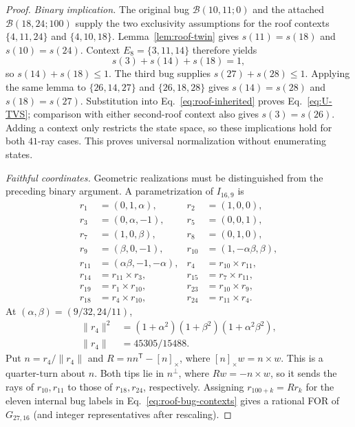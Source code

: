\documentclass[aps,pra,reprint,superscriptaddress,longbibliography,nofootinbib,floatfix,10pt]{revtex4-2}
\theoremstyle{definition}\newtheorem{definition}[theorem]{Definition}
\theoremstyle{remark}\newtheorem{remark}[theorem]{Remark}
\begin{document}
\begin{proof}
\emph{Binary implication.} The original bug $\mathcal B(10,11;0)$ and the attached $\mathcal B(18,24;100)$ supply the two exclusivity assumptions for the roof contexts $\{4,11,24\}$ and $\{4,10,18\}$. Lemma~\ref{lem:roof-twin} gives $s(11)=s(18)$ and $s(10)=s(24)$. Context $E_8=\{3,11,14\}$ therefore yields
\begin{equation}\label{eq:roof-inherited}
s(3)+s(14)+s(18)=1,
\end{equation}
so $s(14)+s(18)\le1$. The third bug supplies $s(27)+s(28)\le1$. Applying the same lemma to $\{26,14,27\}$ and $\{26,18,28\}$ gives $s(14)=s(28)$ and $s(18)=s(27)$. Substitution into Eq.~\eqref{eq:roof-inherited} proves Eq.~\eqref{eq:U-TVS}; comparison with either second-roof context also gives $s(3)=s(26)$. Adding a context only restricts the state space, so these implications hold for both $41$-ray cases. This proves universal normalization without enumerating states.

\emph{Faithful coordinates.} Geometric realizations must be distinguished from the preceding binary argument. A parametrization of $I_{16,9}$ is
\begin{equation}\label{eq:roof-base-rays}
\begin{aligned}
r_1&=(0,1,\alpha),&r_2&=(1,0,0),\\
r_3&=(0,\alpha,-1),&r_5&=(0,0,1),\\
r_7&=(1,0,\beta),&r_8&=(0,1,0),\\
r_9&=(\beta,0,-1),&r_{10}&=(1,-\alpha\beta,\beta),\\
r_{11}&=(\alpha\beta,-1,-\alpha),&r_4&=r_{10}\times r_{11},\\
r_{14}&=r_{11}\times r_3,&r_{15}&=r_7\times r_{11},\\
r_{19}&=r_1\times r_{10},&r_{23}&=r_{10}\times r_9,\\
r_{18}&=r_4\times r_{10},&r_{24}&=r_{11}\times r_4.
\end{aligned}
\end{equation}
At $(\alpha,\beta)=(9/32,24/11)$,
\begin{equation}\label{eq:r4-norm-factorization}
\begin{aligned}
\|r_4\|^2&=(1+\alpha^2)(1+\beta^2)(1+\alpha^2\beta^2),\\
\|r_4\|&=45305/15488.
\end{aligned}
\end{equation}
Put $n=r_4/\|r_4\|$ and $R=nn^{\mathsf T}-[n]_\times$, where $[n]_\times w=n\times w$. This is a quarter-turn about $n$. Both tips lie in $n^\perp$, where $Rw=-n\times w$, so it sends the rays of $r_{10},r_{11}$ to those of $r_{18},r_{24}$, respectively. Assigning $r_{100+k}=Rr_k$ for the eleven internal bug labels in Eq.~\eqref{eq:roof-bug-contexts} gives a rational FOR of $G_{27,16}$ (and integer representatives after rescaling).


\end{proof}
\end{document}
